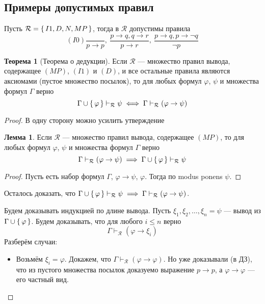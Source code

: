 \documentclass[12pt]{article}
\let\im\rightarrow
\let\n\neg
\let\un\cup
\theoremstyle{definition}
\newtheorem{theorem}{Теорема}[section]
\theoremstyle{statement}
\theoremstyle{theorem}
\newtheorem{lemma}{Лемма}[section]
\begin{document}
\subsection{Примеры допустимых правил}
Пусть $\mathcal{R} = \set{I1, D, N, MP}$, тогда в $\mathcal{R}$
допустимы правила
\begin{displaymath}
  (I0)\frac{}{p \im p},\ \frac{p \im q, q \im r}{p \im r},\ \frac{p
  \im q, p \im \n q}{\n p}
\end{displaymath}

\begin{theorem}[Теорема о дедукции]
  Если $\mathcal{R}$ --- множество правил вывода, содержащее $(MP)$,
  $(I1)$ и $(D)$, и все остальные правила являются аксиомами (пустое
  множество посылок), то для любых формул $\varphi$, $\psi$ и
  множества формул $\Gamma$ верно
  \begin{displaymath}
    \Gamma \un \set{\varphi} \vdash_{\mathcal{R}} \psi \iff \Gamma
    \vdash_{\mathcal{R}} (\varphi \im \psi)
  \end{displaymath}
  \begin{proof}
    В одну сторону можно усилить утверждение

    \begin{lemma}
      Если $\mathcal{R}$ --- множество правил вывода, содержащее $(MP)$,
      то для любых формул $\varphi$, $\psi$ и множества формул $\Gamma$ верно
      \[
        \Gamma \vdash_{\mathcal{R}} (\varphi \im \psi) \implies \Gamma
        \un \set{\varphi} \vdash_{\mathcal{R}} \psi
      \]
      \begin{proof}
        Пусть есть набор формул $\Gamma$, $\varphi \im \psi$, $\varphi$.
        Тогда по modus ponens $\psi$.
      \end{proof}
    \end{lemma}

    Осталось доказать, что $\Gamma \un \set{\varphi}
    \vdash_{\mathcal{R}} \psi \implies \Gamma \vdash_{\mathcal{R}}
    (\varphi \im \psi)$.

    Будем доказывать индукцией по длине вывода. Пусть $\xi_1, \xi_2,
    \dots, \xi_n = \psi$ --- вывод из $\Gamma \un \set{\varphi}$.
    Будем доказывать, что для любого $i \leqslant n$ верно
    \[
      \Gamma \vdash_{\mathcal{R}} (\varphi \im \xi_i)
    \]
    Разберём случаи:
    \begin{itemize}
      \item Возьмём $\xi_i = \varphi$. Докажем, что $\Gamma
        \vdash_{\mathcal{R}} (\varphi \im \varphi)$. Но уже
        доказывали (в ДЗ), что из пустого множества посылок доказуемо
        выражение $p \im p$, а $\varphi \im \varphi$ --- его частный вид.


\end{itemize}
\end{proof}
\end{theorem}
\end{document}
